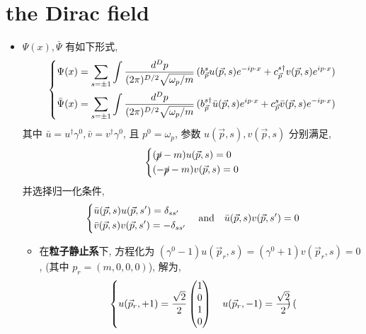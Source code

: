 \section{the Dirac field}
\begin{itemize}
	\item $\Psi(x), \bar{\Psi}$ 有如下形式,
	\begin{equation}
		\begin{dcases}
			\Psi(x) = \sum_{s = \pm 1} \int \frac{d^D p}{(2 \pi)^{D / 2} \sqrt{\omega_p / m}} \, (b^s_{\vec{p}} u(\vec{p}, s) e^{- i p \cdot x} + c^{s \dag}_{\vec{p}} v(\vec{p}, s) e^{i p \cdot x}) \\
			\bar{\Psi}(x) = \sum_{s = \pm 1} \int \frac{d^D p}{(2 \pi)^{D / 2} \sqrt{\omega_p / m}} \, (b^{s \dag}_{\vec{p}} \bar{u}(\vec{p}, s) e^{i p \cdot x} + c^s_{\vec{p}} \bar{v}(\vec{p}, s) e^{- i p \cdot x})
		\end{dcases}
	\end{equation}
		其中 $\bar{u} = u^\dag \gamma^0, \bar{v} = v^\dag \gamma^0$, 且 $p^0 = \omega_p$, 参数 $u(\vec{p}, s), v(\vec{p}, s)$ 分别满足,
	\begin{equation}
		\begin{dcases}
			(\cancel{p} - m) u(\vec{p}, s) = 0 \\
			(- \cancel{p} - m) v(\vec{p}, s) = 0
		\end{dcases}
	\end{equation}
	并选择归一化条件,
	\begin{equation}
		\begin{dcases}
			\bar{u}(\vec{p}, s) u(\vec{p}, s') = \delta_{s s'} \\
			\bar{v}(\vec{p}, s) v(\vec{p}, s') = - \delta_{s s'}
		\end{dcases} \quad \text{and} \quad \bar{u}(\vec{p}, s) v(\vec{p}, s') = 0
	\end{equation}
	\begin{itemize}
		\item 在\textbf{粒子静止系}下, 方程化为 $(\gamma^0 - 1) u(\vec{p}_r, s) = (\gamma^0 + 1) v(\vec{p}_r, s) = 0$, (其中 $p_r = (m, 0, 0, 0)$), 解为,
		\begin{equation}
			\begin{dcases}
				u(\vec{p}_r, + 1) = \frac{\sqrt{2}}{2} \begin{pmatrix}
					1 \\
					0 \\
					1 \\
					0
				\end{pmatrix} \quad u(\vec{p}_r, - 1) = \frac{\sqrt{2}}{2} \begin{pmatrix}

\end{pmatrix}
\end{dcases}
\end{equation}
\end{itemize}
\end{itemize}
